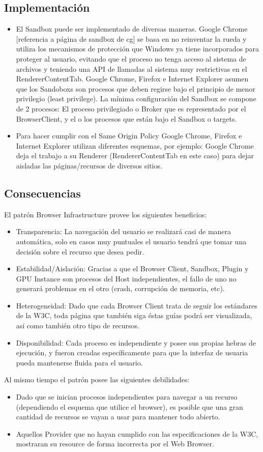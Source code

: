 \subsection{Implementación}
\begin{itemize}
\item El Sandbox puede ser implementado de diversas maneras. Google Chrome [referencia a página de sandbox de cg] se basa en no reinventar la rueda y utiliza los mecanismos de protección que Windows ya tiene incorporados para proteger al usuario, evitando que el proceso no tenga acceso al sistema de archivos y teniendo una API de llamadas al sistema muy restrictivas en el RendererContentTab. Google Chrome, Firefox e Internet Explorer asumen que los Sandoboxs son procesos que deben regirse bajo el principio de menor privilegio (least privilege). La mínima configuración del Sandbox se compone de 2 procesos: El proceso privilegiado o Broker que es representado por el BrowserClient, y el o los procesos que están bajo el Sandbox o targets.
\item Para hacer cumplir con el Same Origin Policy Google Chrome, Firefox e Internet Explorer utilizan diferentes esquemas, por ejemplo: Google Chrome deja el trabajo a su Renderer (RendererContentTab en este caso) para dejar aisladas las páginas/recursos de diversos sitios.
\end{itemize}
\subsection{Consecuencias}
El patrón Browser Infrastructure provee los siguientes beneficios:
\begin{itemize}
	\item Transparencia: La navegación del usuario se realizará casi de manera automática, solo en casos muy puntuales el usuario tendrá que tomar una decisión sobre el recurso que desea pedir.
\item Estabilidad/Aislación: Gracias a que el Browser Client, Sandbox, Plugin y GPU Instance son procesos del Host independientes, el fallo de uno no generará problemas en el otro (crash, corrupción de memoria, etc).
	\item Heterogeneidad: Dado que cada Browser Client trata de seguir los estándares de la W3C, toda página que también siga éstas guías podrá ser visualizada, así como también otro tipo de recursos.
	\item Disponibilidad: Cada proceso es independiente y posee sus propias hebras de ejecución, y fueron creadas específicamente para que la interfaz de usuaria pueda mantenerse fluida para el usuario.
\end{itemize}
Al mismo tiempo el patrón posee las siguientes debilidades:
\begin{itemize}
	\item Dado que se inician procesos independientes para navegar a un recurso (dependiendo el esquema que utilice el browser), es posible que una gran cantidad de recursos se vayan a usar para mantener todo abierto.
	\item Aquellos Provider que no hayan cumplido con las especificaciones de la W3C, mostraran su resource de forma incorrecta por el Web Browser.
\end{itemize}
